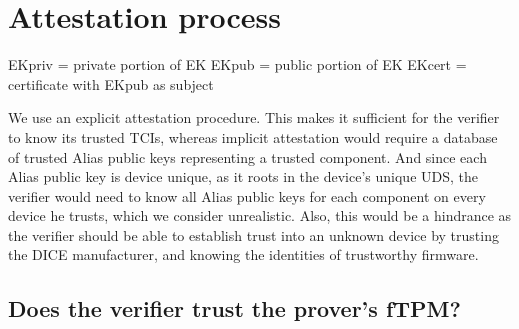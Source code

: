 
\section{Attestation process}\label{sec:attestation_process}

EKpriv = private portion of EK
EKpub = public portion of EK
EKcert = certificate with EKpub as subject


We use an explicit attestation procedure.
This makes it sufficient for the verifier to know its trusted TCIs, whereas implicit attestation would require a database of trusted Alias public keys representing a trusted component.
And since each Alias public key is device unique, as it roots in the device's unique UDS, the verifier would need to know all Alias public keys for each component on every device he trusts, which we consider unrealistic.
Also, this would be a hindrance as the verifier should be able to establish trust into an unknown device by trusting the DICE manufacturer, and knowing the identities of trustworthy firmware.


\subsection{Does the verifier trust the prover's fTPM?}\label{subsec:trust_prover_tpm}


